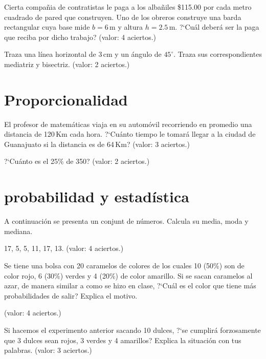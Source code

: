 \documentclass[11pt]{article}
\begin{document}
Cierta compa\~nia de contratistas le paga a los alba\~niles \$115.00 por cada
metro cuadrado de pared que construyen. Uno de los obreros construye una barda
rectangular cuya base mide $b=6$\,m y altura $h=2.5$\,m. ?`Cu\'al deber\'a ser la
paga que reciba por dicho trabajo? \hfill(valor: 4 aciertos.)


\newpage
Traza una l\'inea horizontal de 3\,cm y un \'angulo de $45^{\circ}$. Traza sus
correspondientes mediatriz y bisectriz. \hfill(valor: 2 aciertos.)

\vspace{4cm}
\section{Proporcionalidad} %
\label{sec:proporcionalidad}

El profesor de matem\'aticas viaja en su autom\'ovil recorriendo en promedio
una distancia de 120\,Km cada hora. ?`Cu\'anto tiempo le tomar\'a llegar a la
ciudad de Guanajuato si la distancia es de 64\,Km? \hfill(valor: 3 aciertos.)

\vspace{3.5cm}
?`Cu\'anto es el 25\% de 350? \hfill(valor: 2 aciertos.)

\vspace{3.5cm}
\section{probabilidad y estad\'istica} %
\label{sec:probabilidad_y_estad'istica}


A continuaci\'on se presenta un conjunt de n\'umeros. Calcula su media, moda y 
mediana.

17, 5, 5, 11, 17, 13. \hfill(valor: 4 aciertos.)

\vspace{5cm}
Se tiene una bolsa con 20 caramelos de colores de los cuales 10 (50\%) son de
color rojo, 6 (30\%) verdes y 4 (20\%) de color amarillo. Si se sacan caramelos
al azar, de manera similar a como se hizo en clase, ?`Cu\'al es el color que
tiene m\'as probabilidades de salir? Explica el motivo. 

\hfill(valor: 4 aciertos.)

\newpage
Si hacemos el experimento anterior sacando 10 dulces, ?`se cumplir\'a
forzosamente que 3 dulces sean rojos, 3 verdes y 4 amarillos? Explica la
situaci\'on con tus palabras. \hfill(valor: 3 aciertos.)
\end{document}
